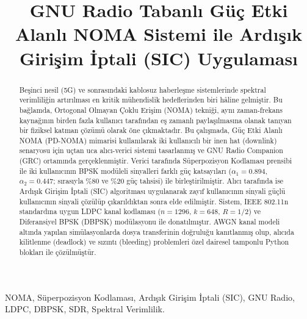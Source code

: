\documentclass[conference]{IEEEtran}
\begin{document}
\title{GNU Radio Tabanlı Güç Etki Alanlı NOMA Sistemi ile Ardışık Girişim İptali (SIC) Uygulaması}

\author{
    \and
}

\maketitle

\begin{abstract}
Beşinci nesil (5G) ve sonrasındaki kablosuz haberleşme sistemlerinde spektral verimliliğin artırılması en kritik mühendislik hedeflerinden biri hâline gelmiştir. Bu bağlamda, Ortogonal Olmayan Çoklu Erişim (NOMA) tekniği, aynı zaman-frekans kaynağının birden fazla kullanıcı tarafından eş zamanlı paylaşılmasına olanak tanıyan bir fiziksel katman çözümü olarak öne çıkmaktadır. Bu çalışmada, Güç Etki Alanlı NOMA (PD-NOMA) mimarisi kullanılarak iki kullanıcılı bir inen hat (downlink) senaryosu için uçtan uca alıcı-verici sistemi tasarlanmış ve GNU Radio Companion (GRC) ortamında gerçeklenmiştir. Verici tarafında Süperpozisyon Kodlaması prensibi ile iki kullanıcının BPSK modüleli sinyalleri farklı güç katsayıları ($\alpha_1 = 0.894$, $\alpha_2 = 0.447$; sırasıyla \%80 ve \%20 güç tahsisi) ile birleştirilmiştir. Alıcı tarafında ise Ardışık Girişim İptali (SIC) algoritması uygulanarak zayıf kullanıcının sinyali güçlü kullanıcının sinyali çözülüp çıkarıldıktan sonra elde edilmiştir. Sistem, IEEE 802.11n standardına uygun LDPC kanal kodlaması ($n = 1296$, $k = 648$, $R = 1/2$) ve Diferansiyel BPSK (DBPSK) modülasyonu ile donatılmıştır. AWGN kanal modeli altında yapılan simülasyonlarda dosya transferinin doğruluğu kanıtlanmış olup, alıcıda kilitlenme (deadlock) ve sızıntı (bleeding) problemleri özel dairesel tamponlu Python blokları ile çözülmüştür.
\end{abstract}

\begin{IEEEkeywords}
NOMA, Süperpozisyon Kodlaması, Ardışık Girişim İptali (SIC), GNU Radio, LDPC, DBPSK, SDR, Spektral Verimlilik.
\end{IEEEkeywords}









\end{document}
